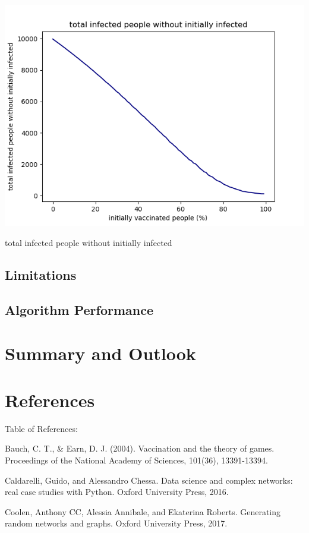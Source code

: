 \documentclass[11pt]{article}
\begin{document}
\begin{center}
\includegraphics[scale=1]{totalinfecwoinitinfec}
\end{center}
total infected people without initially infected


\subsection{Limitations}

\subsection{Algorithm Performance}

\section{Summary and Outlook}

\section{References}
Table of References: 
\vspace{14px}

Bauch, C. T., \& Earn, D. J. (2004). Vaccination and the theory of games. Proceedings of the National Academy of Sciences, 101(36), 13391-13394.
\vspace{14px}

Caldarelli, Guido, and Alessandro Chessa. Data science and complex networks: real case studies with Python. Oxford University Press, 2016.

Coolen, Anthony CC, Alessia Annibale, and Ekaterina Roberts. Generating random networks and graphs. Oxford University Press, 2017.
\end{document}

